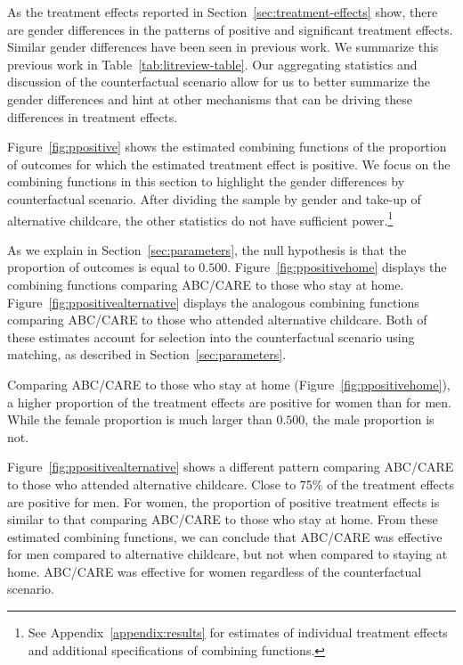 
As the treatment effects reported in Section~\ref{sec:treatment-effects} show, there are gender differences in the patterns of positive and significant treatment effects. Similar gender differences have been seen in previous work. We summarize this previous work in Table~\ref{tab:litreview-table}. Our aggregating statistics and discussion of the counterfactual scenario allow for us to better summarize the gender differences and hint at other mechanisms that can be driving these differences in treatment effects.

Figure~\ref{fig:ppositive} shows the estimated combining functions of the proportion of outcomes for which the estimated treatment effect is positive. We focus on the combining functions in this section to highlight the gender differences by counterfactual scenario. After dividing the sample by gender and take-up of alternative childcare, the other statistics do not have sufficient power.\footnote{See Appendix~\ref{appendix:results} for estimates of individual treatment effects and additional specifications of combining functions.} 

As we explain in Section~\ref{sec:parameters}, the null hypothesis is that the proportion of outcomes is equal to $0.500$. Figure~\ref{fig:ppositivehome} displays the combining functions comparing ABC/CARE to those who stay at home. Figure~\ref{fig:ppositivealternative} displays the analogous combining functions comparing ABC/CARE to those who attended alternative childcare. Both of these estimates account for selection into the counterfactual scenario using matching, as described in Section~\ref{sec:parameters}.

Comparing ABC/CARE to those who stay at home (Figure~\ref{fig:ppositivehome}), a higher proportion of the treatment effects are positive for women than for men. While the female proportion is much larger than $0.500$, the male proportion is not. 

Figure~\ref{fig:ppositivealternative} shows a different pattern comparing ABC/CARE to those who attended alternative childcare. Close to 75\% of the treatment effects are positive for men. For women, the proportion of positive treatment effects is similar to that comparing ABC/CARE to those who stay at home. From these estimated combining functions, we can conclude that ABC/CARE was effective for men compared to alternative childcare, but not when compared to staying at home. ABC/CARE was effective for women regardless of the counterfactual scenario. 

